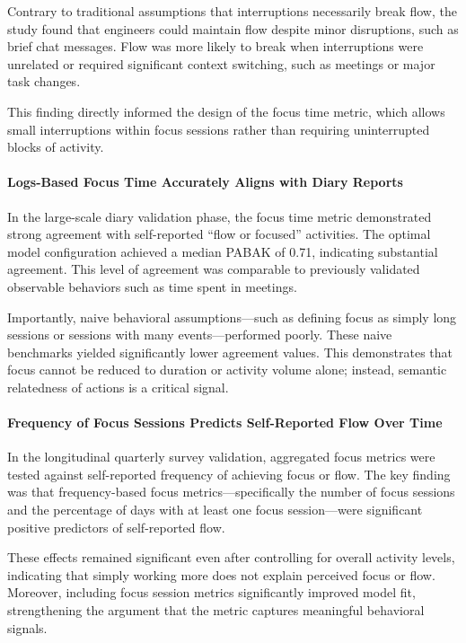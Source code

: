 Contrary to traditional assumptions that interruptions necessarily break flow, the study found that engineers could maintain flow despite minor disruptions, such as brief chat messages. Flow was more likely to break when interruptions were unrelated or required significant context switching, such as meetings or major task changes.

This finding directly informed the design of the focus time metric, which allows small interruptions within focus sessions rather than requiring uninterrupted blocks of activity.

\paragraph{Logs-Based Focus Time Accurately Aligns with Diary Reports}

In the large-scale diary validation phase, the focus time metric demonstrated strong agreement with self-reported “flow or focused” activities. The optimal model configuration achieved a median PABAK of 0.71, indicating substantial agreement. This level of agreement was comparable to previously validated observable behaviors such as time spent in meetings.

Importantly, naive behavioral assumptions—such as defining focus as simply long sessions or sessions with many events—performed poorly. These naive benchmarks yielded significantly lower agreement values. This demonstrates that focus cannot be reduced to duration or activity volume alone; instead, semantic relatedness of actions is a critical signal.

\paragraph{Frequency of Focus Sessions Predicts Self-Reported Flow Over Time}

In the longitudinal quarterly survey validation, aggregated focus metrics were tested against self-reported frequency of achieving focus or flow. The key finding was that frequency-based focus metrics—specifically the number of focus sessions and the percentage of days with at least one focus session—were significant positive predictors of self-reported flow.

These effects remained significant even after controlling for overall activity levels, indicating that simply working more does not explain perceived focus or flow. Moreover, including focus session metrics significantly improved model fit, strengthening the argument that the metric captures meaningful behavioral signals.

